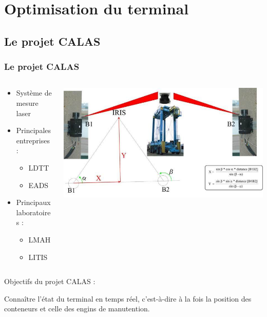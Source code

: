 \documentclass{beamer}
\begin{document}
\section{Optimisation du terminal}
\begin{frame}
\subsection*{Le projet CALAS}
\frametitle{Le projet CALAS}
\begin{columns}
    \begin{column}[l]{4.9cm}	
	\begin{itemize}
		\item Système de mesure laser
		\item Principales entreprises :
		    \begin{itemize}
			\item LDTT
			\item EADS
		    \end{itemize}
		\item Principaux laboratoires :
			 \begin{itemize}
			    \item LMAH
			    \item LITIS
			  \end{itemize}
	\end{itemize}
    \end{column}
    \begin{column}[r]{5cm}
		\begin{flushright}
		  \includegraphics[height=.37\textheight]{fig/angles.jpg}
		\end{flushright}
    \end{column}
 \end{columns}	
	\begin{block}{Objectifs du projet CALAS : }
		\begin{minipage}[]{\columnwidth}
			Connaître l'état du terminal en temps réel, c'est-à-dire à la fois la position des conteneurs et celle des engins de manutention.
		\end{minipage}
	\end{block}
\end{frame}
\end{document}
